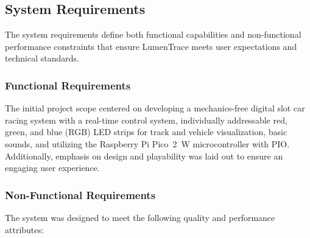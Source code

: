\documentclass[10pt,journal,final,a4paper]{IEEEtran}
\begin{document}
\subsection{System Requirements}
\label{subsec:system-requirements}

The system requirements define both functional capabilities and non-functional performance constraints that ensure LumenTrace meets user expectations and technical standards.

\subsubsection*{Functional Requirements}

The initial project scope centered on developing a mechanics-free digital slot car racing system with a real-time control system, individually addressable red, green, and blue (RGB) LED strips for track and vehicle visualization, basic sounds, and utilizing the Raspberry Pi Pico~2~W microcontroller with PIO. Additionally, emphasis on design and playability was laid out to ensure an engaging user experience.

\subsubsection*{Non-Functional Requirements}

The system was designed to meet the following quality and performance attributes:
\end{document}
